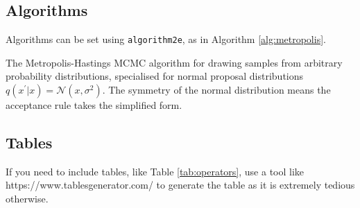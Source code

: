 \documentclass{l4proj}
\begin{document}
\subsection{Algorithms}
Algorithms can be set using \texttt{algorithm2e}, as in Algorithm \ref{alg:metropolis}.

\begin{algorithm}
    \DontPrintSemicolon
    
\caption{The Metropolis-Hastings MCMC algorithm for drawing samples from arbitrary probability distributions, 
specialised for normal proposal distributions $q(x^\prime|x) = \mathcal{N}(x, \sigma^2)$. The symmetry of the normal distribution means the acceptance rule takes the simplified form.}\label{alg:metropolis}
\end{algorithm}

\subsection{Tables}

If you need to include tables, like Table \ref{tab:operators}, use a tool like https://www.tablesgenerator.com/ to generate the table as it is
extremely tedious otherwise. 
\end{document}
